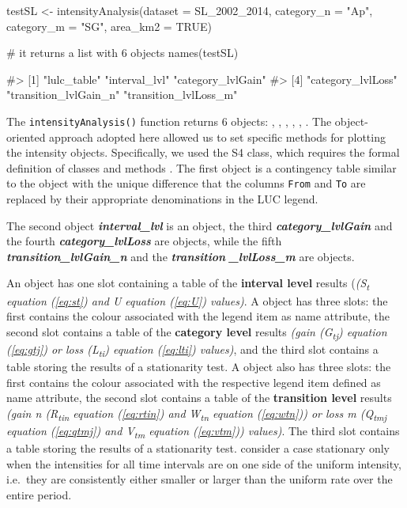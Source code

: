 \begin{Schunk}
\begin{Sinput}
testSL <- intensityAnalysis(dataset = SL_2002_2014, category_n = "Ap",
                            category_m = "SG", area_km2 = TRUE)

# it returns a list with 6 objects
names(testSL)
\end{Sinput}
\begin{Soutput}
#> [1] "lulc_table"           "interval_lvl"         "category_lvlGain"    
#> [4] "category_lvlLoss"     "transition_lvlGain_n" "transition_lvlLoss_m"
\end{Soutput}
\end{Schunk}

The \texttt{intensityAnalysis()} function returns 6 objects:
, ,  , ,
, . The object-oriented
approach adopted here allowed us to set specific methods for plotting
the intensity objects. Specifically, we used the S4 class, which
requires the formal definition of classes and methods
\citep{Chambers2008}. The first object is a contingency table similar to
the  object with the unique difference that the columns
\texttt{From} and \texttt{To} are replaced by their appropriate
denominations in the LUC legend.

The second object \emph{\textbf{interval\_lvl}} is an 
object, the third \emph{\textbf{category\_lvlGain}} and the fourth
\emph{\textbf{category\_lvlLoss}} are  objects, while
the fifth \emph{\textbf{transition\_lvlGain\_n}} and the
\emph{\textbf{transition}} \emph{\textbf{\_lvlLoss\_m}} are  objects.

An  object has one slot containing a table of the
\textbf{interval level} results (\emph{(S\textsubscript{t} equation
(\ref{eq:st}) and U equation (\ref{eq:U}) values)}. A 
object has three slots: the first contains the colour associated with
the legend item as name attribute, the second slot contains a table of
the \textbf{category level} results \emph{(gain (G\textsubscript{tj})
equation (\ref{eq:gtj}) or loss (L\textsubscript{ti}) equation
(\ref{eq:lti}) values)}, and the third slot contains a table storing the
results of a stationarity test. A  object also has
three slots: the first contains the colour associated with the
respective legend item defined as name attribute, the second slot
contains a table of the \textbf{transition level} results \emph{(gain n
(R\textsubscript{tin} equation (\ref{eq:rtin}) and W\textsubscript{tn}
equation (\ref{eq:wtn})) or loss m (Q\textsubscript{tmj} equation
(\ref{eq:qtmj}) and V\textsubscript{tm} equation (\ref{eq:vtm}))
values)}. The third slot contains a table storing the results of a
stationarity test. \citet{Aldwaik2012} consider a case stationary only
when the intensities for all time intervals are on one side of the
uniform intensity, i.e.~they are consistently either smaller or larger
than the uniform rate over the entire period.

